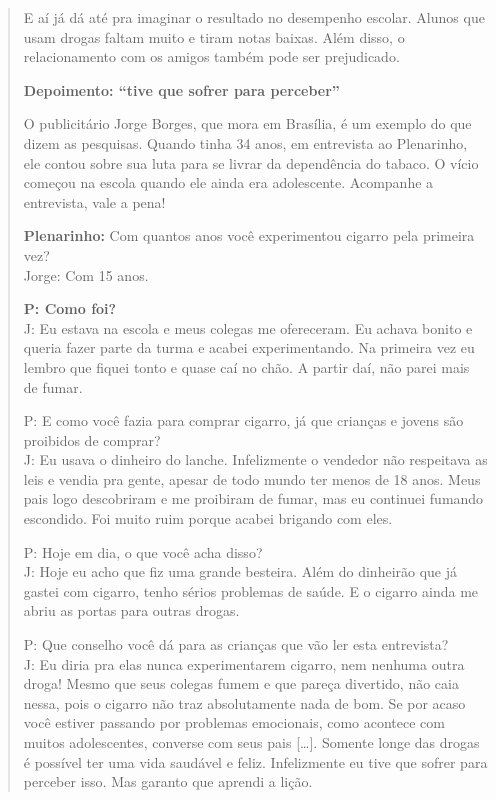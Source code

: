 \begin{quote}
E aí já dá até pra imaginar o resultado no desempenho escolar. Alunos
que usam drogas faltam muito e tiram notas baixas. Além disso, o
relacionamento com os amigos também pode ser prejudicado.

\textbf{Depoimento: ``tive que sofrer para perceber''}

O publicitário Jorge Borges, que mora em Brasília, é um exemplo do que
dizem as pesquisas. Quando tinha 34 anos, em entrevista ao Plenarinho,
ele contou sobre sua luta para se livrar da dependência do tabaco. O
vício começou na escola quando ele ainda era adolescente. Acompanhe a
entrevista, vale a pena!

\textbf{Plenarinho:} Com quantos anos você experimentou cigarro pela
primeira vez?\\
Jorge: Com 15 anos.

\textbf{P: Como foi?}\\
J: Eu estava na escola e meus colegas me ofereceram. Eu achava bonito e
queria fazer parte da turma e acabei experimentando. Na primeira vez eu
lembro que fiquei tonto e quase caí no chão. A partir daí, não parei
mais de fumar.

P: E como você fazia para comprar cigarro, já que crianças e jovens são
proibidos de comprar?\\
J: Eu usava o dinheiro do lanche. Infelizmente o vendedor não respeitava
as leis e vendia pra gente, apesar de todo mundo ter menos de 18 anos.
Meus pais logo descobriram e me proibiram de fumar, mas eu continuei
fumando escondido. Foi muito ruim porque acabei brigando com eles.

P: Hoje em dia, o que você acha disso?\\
J: Hoje eu acho que fiz uma grande besteira. Além do dinheirão que já
gastei com cigarro, tenho sérios problemas de saúde. E o cigarro ainda
me abriu as portas para outras drogas.

P: Que conselho você dá para as crianças que vão ler esta entrevista?\\
J: Eu diria pra elas nunca experimentarem cigarro, nem nenhuma outra
droga! Mesmo que seus colegas fumem e que pareça divertido, não caia
nessa, pois o cigarro não traz absolutamente nada de bom. Se por acaso
você estiver passando por problemas emocionais, como acontece com muitos
adolescentes, converse com seus pais {[}\ldots{}{]}. Somente longe das
drogas é possível ter uma vida saudável e feliz. Infelizmente eu tive
que sofrer para perceber isso. Mas garanto que aprendi a lição.

\end{quote}

